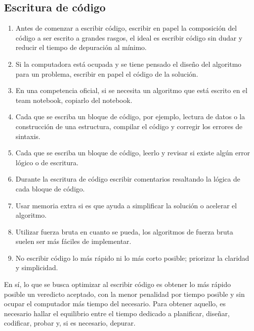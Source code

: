 \subsection{Escritura de código}
\begin{enumerate}[resume=icpc]
    \item Antes de comenzar a escribir código, escribir en papel la composición del código a ser escrito a grandes rasgos, el ideal es escribir código sin dudar y reducir el tiempo de depuración al mínimo.
    \item Si la computadora está ocupada y se tiene pensado el diseño del algoritmo para un problema, escribir en papel el código de la solución.
    \item En una competencia oficial, si se necesita un algoritmo que está escrito en el team notebook, copiarlo del notebook.
    \item Cada que se escriba un bloque de código, por ejemplo, lectura de datos o la construcción de una estructura, compilar el código y corregir los errores de sintaxis.
    \item Cada que se escriba un bloque de código, leerlo y revisar si existe algún error lógico o de escritura.
    \item Durante la escritura de código escribir comentarios resaltando la lógica de cada bloque de código.
    \item Usar memoria extra si es que ayuda a simplificar la solución o acelerar el algoritmo.
    \item Utilizar fuerza bruta en cuanto se pueda, los algoritmos de fuerza bruta suelen ser más fáciles de implementar.
    \item No escribir código lo más rápido ni lo más corto posible; priorizar la claridad y simplicidad.
\end{enumerate}
En sí, lo que se busca optimizar al escribir código es obtener lo más rápido posible un veredicto aceptado, con la menor penalidad por tiempo posible y sin ocupar el computador más tiempo del necesario. Para obtener aquello, es necesario hallar el equilibrio entre el tiempo dedicado a planificar, diseñar, codificar, probar y, si es necesario, depurar.
\pagebreak

